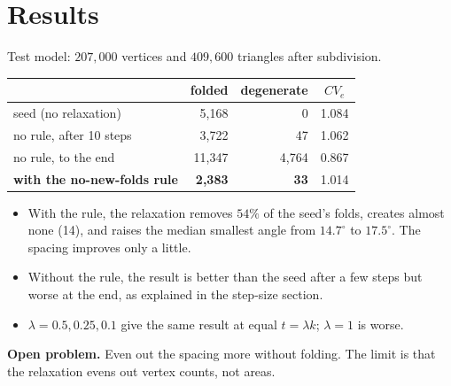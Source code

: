 \documentclass[11pt,a4paper]{article}
\begin{document}
\section{Results}
Test model: $207{,}000$ vertices and $409{,}600$ triangles after subdivision.

\begin{center}
\begin{tabular}{lrrc}
\toprule
 & folded & degenerate & $CV_e$ \\
\midrule
seed (no relaxation) & 5{,}168 & 0 & 1.084 \\
no rule, after 10 steps & 3{,}722 & 47 & 1.062 \\
no rule, to the end & 11{,}347 & 4{,}764 & 0.867 \\
\textbf{with the no-new-folds rule} & \textbf{2{,}383} & \textbf{33} & 1.014 \\
\bottomrule
\end{tabular}
\end{center}

\begin{itemize}
    \item With the rule, the relaxation removes $54\%$ of the seed's folds, creates almost none (14), and raises the median smallest angle from $14.7^\circ$ to $17.5^\circ$. The spacing improves only a little.
    \item Without the rule, the result is better than the seed after a few steps but worse at the end, as explained in the step-size section.
    \item $\lambda = 0.5, 0.25, 0.1$ give the same result at equal $t = \lambda k$; $\lambda = 1$ is worse.
\end{itemize}

\textbf{Open problem.} Even out the spacing more without folding. The limit is that the relaxation evens out vertex counts, not areas.
\end{document}
